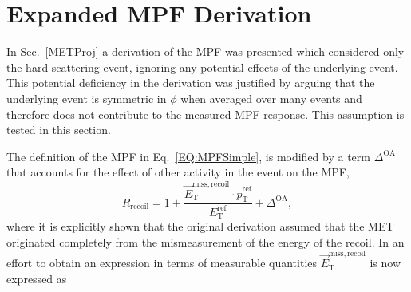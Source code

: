 \section{Expanded MPF Derivation}

In Sec.~\ref{METProj} a derivation of the MPF was presented which considered only the hard scattering event, ignoring any potential effects of the underlying event.  
This potential deficiency in the derivation was justified by arguing that the underlying event is symmetric in $\phi$ when averaged over many events and therefore does not contribute to the measured MPF response.  
This assumption is tested in this section.  

The definition of the MPF in Eq.~\ref{EQ:MPFSimple}, is modified by a term $\Delta^{\mathrm{OA}}$ that accounts for the effect of other activity in the event on the MPF, 
\begin{equation}
  \label{Eq:MPFWithDelta}
  R_{\mathrm{recoil}}=1+\frac{\vec{E}_{\mathrm T}^{\mathrm{miss, recoil}}\cdot\hat{p}_{\mathrm T}^{\mathrm{ref}}}{E_{\mathrm T}^{\mathrm{ref}}} + \Delta^{\mathrm{OA}}, 
\end{equation}
\noindent
where it is explicitly shown that the original derivation assumed that the MET originated completely from the mismeasurement of the energy of the recoil.  
In an effort to obtain an expression in terms of measurable quantities $\vec{E}_{\mathrm T}^{\mathrm{miss, recoil}}$ is now expressed as 


